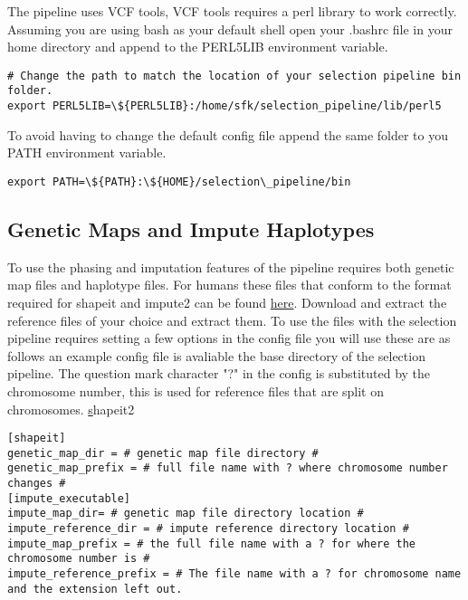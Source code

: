 \documentclass[a4paper,10pt]{article}
\begin{document}
The pipeline uses VCF tools, VCF tools requires a perl library to work correctly. Assuming you are using bash as your default shell open your .bashrc file in your home directory and append to the PERL5LIB environment variable.

\begin{verbatim}
# Change the path to match the location of your selection pipeline bin folder.
export PERL5LIB=\${PERL5LIB}:/home/sfk/selection_pipeline/lib/perl5
\end{verbatim}

To avoid having to change the default config file append the same folder to you PATH environment variable.\\
\begin{verbatim}
export PATH=\${PATH}:\${HOME}/selection\_pipeline/bin
\end{verbatim}

\subsection{Genetic Maps and Impute Haplotypes}
To use the phasing and imputation features of the pipeline requires both genetic map files and haplotype files. For humans these files that conform to the format required for shapeit and impute2 can be found \href{http://mathgen.stats.ox.ac.uk/impute/impute_v2.html#reference}{here}. Download and extract the reference files of your choice and extract them. To use the files with the selection pipeline requires setting a few options in the config file you will use these are as follows an example config file is avaliable the base directory of the selection pipeline. The question mark character "?" in the config is substituted by the chromosome number, this is used for reference files that are split on chromosomes. \href{http://mathgen.stats.ox.ac.uk/impute/ALL_1000G_phase1integrated_v3_impute_macGT1.tgz} shapeit2 \href{http://www.shapeit.fr/files/genetic_map_b37.tar.gz}\\
\begin{verbatim}
[shapeit]
genetic_map_dir = # genetic map file directory #
genetic_map_prefix = # full file name with ? where chromosome number changes #
[impute_executable]
impute_map_dir= # genetic map file directory location #
impute_reference_dir = # impute reference directory location #
impute_map_prefix = # the full file name with a ? for where the chromosome number is #
impute_reference_prefix = # The file name with a ? for chromosome name and the extension left out. 
\end{verbatim}
\end{document}
